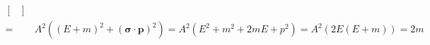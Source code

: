 \documentclass[working, oneside]{../../../Preambles/tuftebook}
\begin{document}
\begin{solution}
\begin{align*}
\begin{bmatrix}
\end{bmatrix} \\
    =& A^2 \left( \left( E + m \right) ^2 + \left( \mathbf{\sigma}\cdot \mathbf{p} \right) ^2 \right) = A^2\left( E^2 + m^2 + 2mE + p^2 \right) = A^2\left( 2E\left( E+m \right)  \right) = 2m \\ 

\end{align*}
\end{solution}
\end{document}
